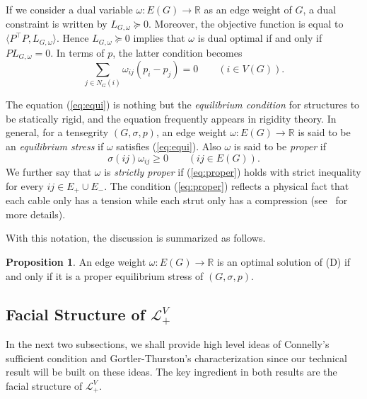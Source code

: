\documentclass[11pt]{article}
\theoremstyle{definition}
\newtheorem{prop}[defi]{Proposition}
\begin{document}
If we consider a dual variable $\omega:E(G)\rightarrow \mathbb{R}$ as an edge weight of $G$, 
a dual constraint is written by $L_{G,\omega}\succeq 0$. 
Moreover, the objective function is equal to $\langle P^\top P,L_{G,\omega} \rangle$. 
Hence $L_{G,\omega}\succeq 0$ implies that $\omega$ is dual optimal if and only if $PL_{G,\omega}=0$.
In terms of $p$, the latter condition becomes
\begin{equation}\label{eq:equi}
\sum_{j \in N_G(i)} \omega_{ij}(p_i-p_j)=0 \qquad (i\in V(G)).
\end{equation}

The equation (\ref{eq:equi}) is nothing but the {\em equilibrium condition} for structures to be statically rigid, and the equation frequently appears in rigidity theory. In general, for a tensegrity $(G,\sigma, p)$, an edge weight $\omega:E(G)\rightarrow \mathbb{R}$ is said to be an {\em equilibrium stress} if $\omega$ satisfies (\ref{eq:equi}).
Also $\omega$ is said to be {\em proper} if 
\begin{equation}\label{eq:proper}
\sigma(ij)\omega_{ij}\geq 0\qquad (ij\in E(G)).
\end{equation}
We further say that $\omega$ is {\em strictly proper} if (\ref{eq:proper}) holds with strict inequality for every $ij \in E_+ \cup E_-$.
The condition (\ref{eq:proper}) reflects a physical fact that each cable only has a tension while each strut only has a compression (see~\cite{RW81} for more details).  

With this notation, the discussion is summarized as follows.
    \begin{prop} \label{prop dual and ESM}
     An edge weight $\omega:E(G)\rightarrow \mathbb{R}$ is an optimal solution of (D) if and only if it is a proper equilibrium stress of $(G,\sigma,p)$. 
    \end{prop}

\subsection{Facial Structure of $\mathcal{L}_+^V$}
In the next two subsections, we shall provide high level ideas of Connelly's sufficient condition and Gortler-Thurston's characterization 
since our  technical result will be built on these ideas.
The key ingredient in both results are the facial structure of $\mathcal{L}_+^V$.
\end{document}
